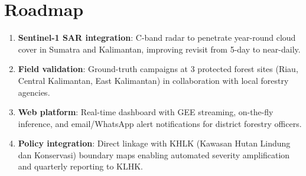 \documentclass[10pt,a4paper,twocolumn]{article}
\begin{document}
\section{Roadmap}
\begin{enumerate}[nosep,itemsep=1pt]
    \item \textbf{Sentinel-1 SAR integration}: C-band radar to
          penetrate year-round cloud cover in Sumatra and
          Kalimantan, improving revisit from 5-day to near-daily.
    \item \textbf{Field validation}: Ground-truth campaigns at 3
          protected forest sites (Riau, Central Kalimantan, East
          Kalimantan) in collaboration with local forestry agencies.
    \item \textbf{Web platform}: Real-time dashboard with GEE
          streaming, on-the-fly inference, and email/WhatsApp alert
          notifications for district forestry officers.
    \item \textbf{Policy integration}: Direct linkage with KHLK
          (Kawasan Hutan Lindung dan Konservasi) boundary maps
          enabling automated severity amplification and quarterly
          reporting to KLHK.
\end{enumerate}

\small


\end{document}
